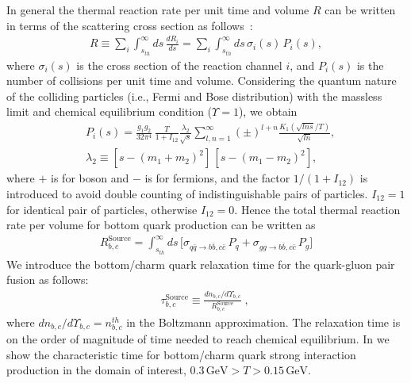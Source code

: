 In general the thermal reaction rate per unit time and volume $R$ can be written in terms of the scattering cross section as follows~\cite{Letessier:2002ony}:
\begin{align}
R\equiv\sum_i\int_{s_{th}}^\infty\!ds\,\frac{dR_i}{ds}=\sum_i\int_{s_{th}}^\infty\!ds\,\sigma_i(s)\,P_i(s),
\end{align}
where $\sigma_i(s)$ is the cross section of the reaction channel $i$, and $P_i(s)$ is the number of collisions per unit time and volume. Considering the quantum nature of the colliding particles (i.e., Fermi and Bose distribution) with the massless limit and chemical equilibrium condition ($\Upsilon=1$), we obtain~\cite{Letessier:2002ony}
\begin{align}
&P_i(s)=\frac{g_1g_2}{32\pi^4}\,\frac{T}{1+I_{12}}\frac{\lambda_2}{\sqrt{s}}\!\sum_{l,n=1}^{\infty}\!(\pm)^{l+n}\frac{K_1(\sqrt{lns}/T)}{\sqrt{ln}},\\
&\lambda_2\equiv\left[s-\left(m_1+m_2\right)^2\right]\,\left[s-\left(m_1-m_2\right)^2\right],
\end{align}
where $+$ is for boson and $-$ is for fermions, and the factor $1/(1+I_{12})$ is introduced to avoid double counting of indistinguishable pairs of particles. $I_{12}=1$ for identical pair of particles, otherwise $I_{12}=0$. Hence the total thermal reaction rate per volume for bottom quark production can be written as
\begin{align}
\label{Bquark_Source}
R^{\mathrm{Source}}_{b,c}=\int^\infty_{s_{th}}ds\,\bigg[\sigma_{q\bar{q}\rightarrow b\bar{b},c\bar{c}}\,P_q+\sigma_{gg\rightarrow b\bar{b},c\bar{c}}\,P_g\bigg]%
\end{align}
We introduce the bottom/charm quark relaxation time for the quark-gluon pair fusion as follows:
\begin{align}
\label{relaxation_time}
&{\tau_{b,c}^{\mathrm{Source}}}\equiv\frac{dn_{b,c}/d\Upsilon_{b,c}}{R^{\mathrm{Source}}_{b,c}}\;,\quad
\end{align}
where $dn_{b,c}/d\Upsilon_{b,c}=n^{th}_{b,c}$ in the Boltzmann approximation. The relaxation time is on the order of magnitude of time needed to reach chemical equilibrium. In  we show the characteristic time for bottom/charm  quark strong interaction production in the domain of interest, $ 0.3\,\mathrm{GeV}>T> 0.15\,\mathrm{GeV}$. 

